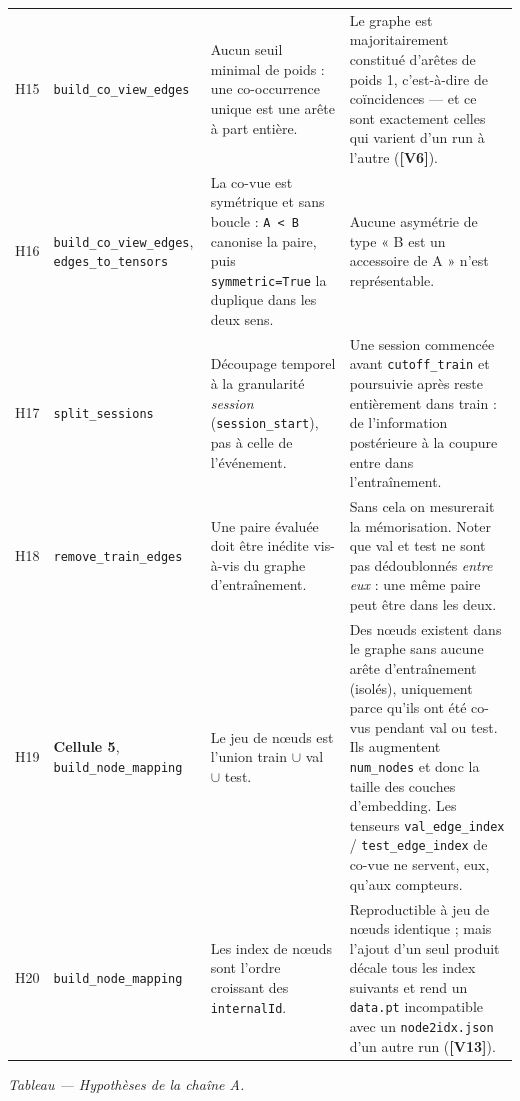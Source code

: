 \documentclass[11pt,a4paper]{article}
\newcommand{\code}[1]{\texttt{\small #1}}
\newcommand{\hyp}[1]{\textcolor{hypcol}{\textbf{\small [#1]}}}
\newcommand{\cell}[1]{\textbf{Cellule #1}}
\begin{document}
{\begin{longtable}{@{}l p{2.45cm} p{5.9cm} p{4.5cm}@{}}
\addlinespace
H15 & \code{build\_co\_view\_edges} & Aucun seuil minimal de poids : une co-occurrence unique est une arête à part entière. & Le graphe est majoritairement constitué d'arêtes de poids 1, c'est-à-dire de coïncidences --- et ce sont exactement celles qui varient d'un run à l'autre (\hyp{V6}). \\
\addlinespace
H16 & \code{build\_co\_view\_edges}, \code{edges\_to\_tensors} & La co-vue est symétrique et sans boucle : \code{A < B} canonise la paire, puis \code{symmetric=True} la duplique dans les deux sens. & Aucune asymétrie de type « B est un accessoire de A » n'est représentable. \\
\addlinespace
H17 & \code{split\_sessions} & Découpage temporel à la granularité \emph{session} (\code{session\_start}), pas à celle de l'événement. & Une session commencée avant \code{cutoff\_train} et poursuivie après reste entièrement dans train : de l'information postérieure à la coupure entre dans l'entraînement. \\
\addlinespace
H18 & \code{remove\_train\_edges} & Une paire évaluée doit être inédite vis-à-vis du graphe d'entraînement. & Sans cela on mesurerait la mémorisation. Noter que val et test ne sont pas dédoublonnés \emph{entre eux} : une même paire peut être dans les deux. \\
\addlinespace
H19 & \cell{5}, \code{build\_node\_mapping} & Le jeu de nœuds est l'union train $\cup$ val $\cup$ test. & Des nœuds existent dans le graphe sans aucune arête d'entraînement (isolés), uniquement parce qu'ils ont été co-vus pendant val ou test. Ils augmentent \code{num\_nodes} et donc la taille des couches d'embedding. Les tenseurs \code{val\_edge\_index} / \code{test\_edge\_index} de co-vue ne servent, eux, qu'aux compteurs. \\
\addlinespace
H20 & \code{build\_node\_mapping} & Les index de nœuds sont l'ordre croissant des \code{internalId}. & Reproductible à jeu de nœuds identique ; mais l'ajout d'un seul produit décale tous les index suivants et rend un \code{data.pt} incompatible avec un \code{node2idx.json} d'un autre run (\hyp{V13}). \\

\end{longtable}
}
\label{tab:hyp-a}
\begin{center}\footnotesize\itshape Tableau \thetable{} --- Hypothèses de la chaîne A.\end{center}

\clearpage
\end{document}
